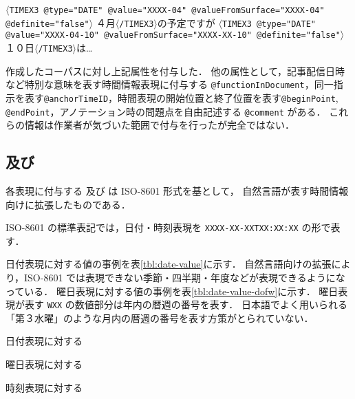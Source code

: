 \documentclass[japanese]{jnlp_1.4}
\newcommand{\modified}[1]{}
\def\value{}
\def\valuefromsurface{}
\def\temporalfunction{}
\begin{document}
{\addtolength{\linewidth}{-6zw}\setlength{\leftskip}{3zw}
\begin{itembox}[l]{\temporalfunction}
{\small
{\tt $\langle$TIMEX3 @type="DATE" @value="XXXX-04" @valueFromSurface="XXXX-04" @definite="false"$\rangle$}
４月{\tt $\langle$/TIMEX3$\rangle$}の予定ですが
{\tt $\langle$TIMEX3 @type="DATE" @value="XXXX-04-10"
@valueFromSurface="XXXX-XX-10" @definite="false"$\rangle$}
１０日{\tt $\langle$/TIMEX3$\rangle$}は…}
\end{itembox}
\par}

作成したコーパスに対し上記属性を付与した．
他の属性として，記事配信日時など特別な意味を表す時間情報表現に付与する {\tt @functionInDocument}，同一指示を表す{\tt @anchorTimeID}，時間表現の開始位置と終了位置を表す{\tt @beginPoint}, {\tt @endPoint}，アノテーション時の問題点を自由記述する {\tt @comment} がある．
これらの情報は作業者が気づいた範囲で付与を行ったが完全ではない．


\subsection{\value 及び \valuefromsurface  \label{subsec:value}}

各表現に付与する \value 及び \valuefromsurface は ISO-8601 形式を基として，
自然言語が表す時間情報向けに拡張したものである．
\modified{\value は文脈情報を用いて正規化を行った値を付与し，
\valuefromsurface 属性は文脈情報を用いずに文字列の表層表現のみから判定できる値を
付与する．}
ISO-8601 の標準表記では，日付・時刻表現を {\tt XXXX-XX-XXTXX:XX:XX} の形で表す．

日付表現に対する値の事例を表\ref{tbl:date-value}に示す．
自然言語向けの拡張により，ISO-8601 では表現できない季節・四半期・年度などが表現できるようになっている．
曜日表現に対する値の事例を表\ref{tbl:date-value-dofw}に示す．
曜日表現が表す {\tt WXX} の数値部分は年内の暦週の番号を表す．
日本語でよく用いられる「第３水曜」のような月内の暦週の番号を表す方策がとられていない．
\modified{これについては 5.2節で詳説する．}

\begin{table}[b]
\begin{minipage}[t]{280pt}
\caption{日付表現に対する \value}
\label{tbl:date-value}

\end{minipage}
\hfill
\begin{minipage}[t]{130pt}
\caption{曜日表現に対する \value}
\label{tbl:date-value-dofw}

\end{minipage}
\end{table}
\begin{table}[b]
\caption{時刻表現に対する \value}
\label{tbl:time-value}

\end{table}
\end{document}
